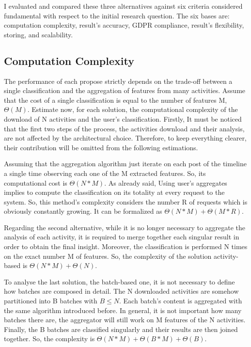 I evaluated and compared these three alternatives against six criteria considered fundamental with respect to the initial research question.
The six bases are: computation complexity, result's accuracy, GDPR compliance, result's flexibility, storing, and scalability.

\subsection{Computation Complexity}
The performance of each propose strictly depends on the trade-off between a single classification and the aggregation of features from many activities.
Assume that the cost of a single classification is equal to the number of features M, $\Theta(M)$.
Estimate now, for each solution, the computational complexity of the download of N activities and the user's classification.
Firstly, It must be noticed that the first two steps of the process, the activities download and their analysis, are not affected by the architectural choice. Therefore, to keep everything clearer, their contribution will be omitted from the following estimations.

Assuming that the aggregation algorithm just iterate on each post of the timeline a single time observing each one of the M extracted features. So, its computational cost is $\Theta(N*M)$.
As already said, Using user's aggregates implies to compute the classification on its totality at every request to the system. So, this method's complexity considers the number R of requests which is obviously constantly growing. 
It can be formalized as \textbf{$\Theta(N*M) + \Theta(M*R)$}.

Regarding the second alternative, while it is no longer necessary to aggregate the analysis of each activity, it is required to merge together each singular result in order to obtain the final insight.
Moreover, the classification is performed N times on the exact number M of features.
So, the complexity of the solution activity-based is \textbf{$\Theta(N*M) + \Theta(N)$}.

To analyse the last solution, the batch-based one, it is not necessary to define how batches are composed in detail.
The N downloaded activities are somehow partitioned into B batches with $B \leq N$.
Each batch's content is aggregated with the same algorithm introduced before. In general, it is not important how many batches there are, the aggregator will still work on M features of the N activities.
Finally, the B batches are classified singularly and their results are then joined together.
So, the complexity is \textbf{$\Theta(N*M) + \Theta(B*M) + \Theta(B)$}.

